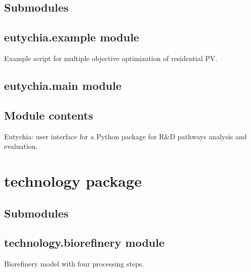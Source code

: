 \documentclass[letterpaper,10pt,english]{sphinxmanual}
\begin{document}
\subsection{Submodules}
\label{\detokenize{doc-src/eutychia:submodules}}

\subsection{eutychia.example module}
\label{\detokenize{doc-src/eutychia:module-eutychia.example}}\label{\detokenize{doc-src/eutychia:eutychia-example-module}}
Example script for multiple objective optimization of residential PV.


\subsection{eutychia.main module}
\label{\detokenize{doc-src/eutychia:eutychia-main-module}}

\subsection{Module contents}
\label{\detokenize{doc-src/eutychia:module-eutychia}}\label{\detokenize{doc-src/eutychia:module-contents}}
Eutychia: user interface for a Python package for R\&D pathways analysis and evaluation.


\section{technology package}
\label{\detokenize{doc-src/technology:technology-package}}\label{\detokenize{doc-src/technology::doc}}

\subsection{Submodules}
\label{\detokenize{doc-src/technology:submodules}}

\subsection{technology.biorefinery module}
\label{\detokenize{doc-src/technology:module-technology.biorefinery_v1}}\label{\detokenize{doc-src/technology:technology-biorefinery-module}}
Biorefinery model with four processing steps.
\end{document}
